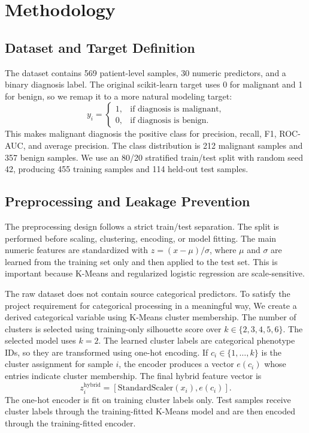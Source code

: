 \documentclass{article}
\begin{document}
\section{Methodology}

\subsection{Dataset and Target Definition}

The dataset contains 569 patient-level samples, 30 numeric predictors, and a binary diagnosis label. The original scikit-learn
target uses 0 for malignant and 1 for benign, so we remap it to a more natural modeling target:
\[
y_i = \begin{cases}
1, & \text{if diagnosis is malignant,} \\
0, & \text{if diagnosis is benign.}
\end{cases}
\]
This makes malignant diagnosis the positive class for precision, recall, F1, ROC-AUC, and average precision. The class
distribution is 212 malignant samples and 357 benign samples. We use an 80/20 stratified train/test split with random seed 42,
producing 455 training samples and 114 held-out test samples.

\subsection{Preprocessing and Leakage Prevention}

The preprocessing design follows a strict train/test separation. The split is performed before scaling, clustering, encoding, or
model fitting. The main numeric features are standardized with $z = (x-\mu)/\sigma$, where $\mu$ and $\sigma$ are learned from the training set
only and then applied to the test set. This is important because K-Means and regularized logistic regression are scale-sensitive.

The raw dataset does not contain source categorical predictors. To satisfy the project requirement for categorical processing
in a meaningful way, We create a derived categorical variable using K-Means cluster membership. The number of clusters is
selected using training-only silhouette score over $k \in \{2, 3, 4, 5, 6\}$. The selected model uses $k = 2$. The learned cluster labels
are categorical phenotype IDs, so they are transformed using one-hot encoding. If $c_i \in \{1, \ldots, k\}$ is the cluster assignment
for sample $i$, the encoder produces a vector $e(c_i)$ whose entries indicate cluster membership. The final hybrid feature vector is
\[
z_i^{\text{hybrid}} = [\text{StandardScaler}(x_i), e(c_i)].
\]
The one-hot encoder is fit on training cluster labels only. Test samples receive cluster labels through the training-fitted
K-Means model and are then encoded through the training-fitted encoder.
\end{document}
